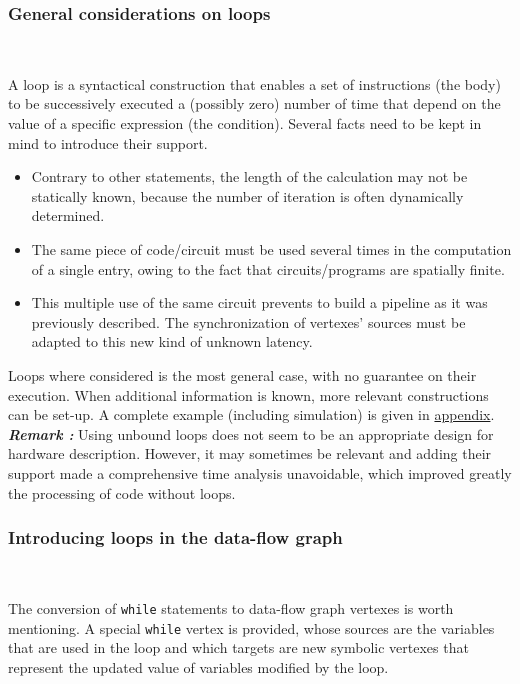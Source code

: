\documentclass[10pt,a4paper]{article}
\newcommand{\code}{\texttt}
\renewcommand{\indent}{~\\\vspace{-.8cm}}
\newcommand{\whileyLine}{\lstinline[language=Whiley,basicstyle=\normalsize\ttfamily]}
\begin{document}
\subsubsection{General considerations on loops}\indent

A loop is a syntactical construction that enables a set of instructions (the body) to be successively executed a (possibly zero) number of time that depend on the value of a specific expression (the condition). Several facts need to be kept in mind to introduce their support.
\begin{itemize}
	\item Contrary to other statements, the length of the calculation may not be statically known, because the number of iteration is often dynamically determined.
	\item The same piece of code/circuit must be used several times in the computation of a single entry, owing to the fact that circuits/programs are spatially finite.
	\item This multiple use of the same circuit prevents to build a pipeline as it was previously described. The synchronization of vertexes' sources must be adapted to this new kind of unknown latency.
\end{itemize}

Loops where considered is the most general case, with no guarantee on their execution. When additional information is known, more relevant constructions can be set-up. A complete example (including simulation) is given in \hyperref[Ex]{appendix}. \\


\textbf{\textsl{Remark :}} Using unbound loops does not seem to be an appropriate design for hardware description. However, it may sometimes be relevant and adding their support made a comprehensive time analysis unavoidable, which improved greatly the processing of code without loops.


\subsubsection{Introducing loops in the data-flow graph} \indent

The conversion of \whileyLine {while} statements to data-flow graph vertexes is worth mentioning. A special \code {while} vertex is provided, whose sources are the variables that are used in the loop and which targets are new symbolic vertexes that represent the updated value of variables modified by the loop.\\
\end{document}
